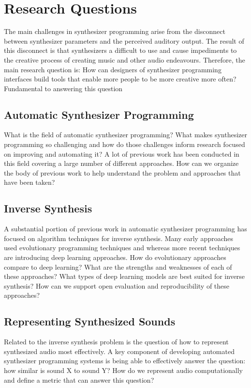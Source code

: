 \section{Research Questions}
The main challenges in synthesizer programming arise from the disconnect between synthesizer parameters and the perceived auditory output. The result of this disconnect is that synthesizers a difficult to use and cause impediments to the creative process of creating music and other audio endeavours. Therefore, the main research question is: How can designers of synthesizer programming interfaces build tools that enable more people to be more creative more often? Fundamental to answering this question

\subsection{Automatic Synthesizer Programming}
What is the field of automatic synthesizer programming? What makes synthesizer programming so challenging and how do those challenges inform research focused on improving and automating it? A lot of previous work has been conducted in this field covering a large number of different approaches. How can we organize the body of previous work to help understand the problem and approaches that have been taken?

\subsection{Inverse Synthesis}
A substantial portion of previous work in automatic synthesizer programming has focused on algorithm techniques for inverse synthesis. Many early approaches used evolutionary programming techniques and whereas more recent techniques are introducing deep learning approaches. How do evolutionary approaches compare to deep learning? What are the strengths and weaknesses of each of these approaches? What types of deep learning models are best suited for inverse synthesis? How can we support open evaluation and reproducibility of these approaches?

\subsection{Representing Synthesized Sounds}
Related to the inverse synthesis problem is the question of how to represent synthesized audio most effectively. A key component of developing automated synthesizer programming systems is being able to effectively answer the question: how similar is sound X to sound Y? How do we represent audio computationally and define a metric that can answer this question?

